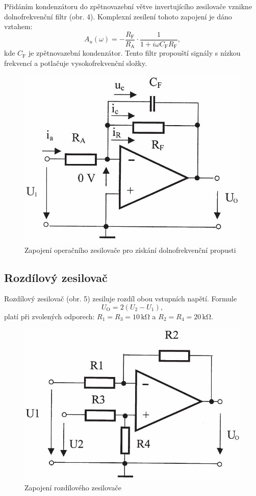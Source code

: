 \documentclass[czech,11pt,a4paper]{article}
\begin{document}
\begin{multicols}{2}
		Přidáním kondenzátoru do zpětnovazební větve invertujícího zesilovače vznikne dolnofrekvenční filtr (obr. 4). Komplexní zesílení tohoto zapojení je dáno vztahem:
		\begin{equation}
			A_u(\omega) = -\frac{R_\mathrm{F}}{R_\mathrm{A}} \cdot \frac{1}{1 + i \omega C_\mathrm{F} R_\mathrm{F}},
		\end{equation}
		kde $C_\mathrm{F}$ je zpětnovazební kondenzátor. Tento filtr propouští signály s nízkou frekvencí a potlačuje vysokofrekvenční složky.
		\begin{figure}[H]
			\centering
			\includegraphics[width=0.8\linewidth]{freq}
			\caption{Zapojení operačního zesilovače pro získání dolnofrekvenční propusti}
		\end{figure}
		\subsection{Rozdílový zesilovač}
		
		Rozdílový zesilovač (obr. 5) zesiluje rozdíl obou vstupních napětí. Formule
		\begin{equation}
			U_\mathrm{O} = 2(U_2 - U_1),
		\end{equation}
		platí při zvolených odporech: $R_1 = R_3 = 10\,\mathrm{k\Omega}$ a $R_2 = R_4 = 20\,\mathrm{k\Omega}$.
		\begin{figure}[H]
			\centering
			\includegraphics[width=0.8\linewidth]{rozd}
			\caption{Zapojení rozdílového zesilovače}
		\end{figure}

\end{multicols}
\end{document}
